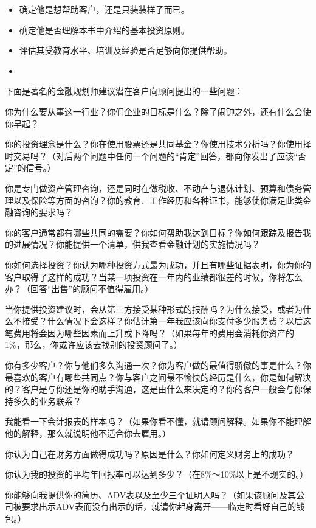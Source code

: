 \documentclass[12pt,oneside]{book}
\begin{document}
\begin{itemize}
\item 确定他是想帮助客户，还是只装装样子而已。
\item 确定他是否理解本书中介绍的基本投资原则。
\item 评估其受教育水平、培训及经验是否足够向你提供帮助。
\item 
\end{itemize}

下面是著名的金融规划师建议潜在客户向顾问提出的一些问题：

你为什么要从事这一行业？你们企业的目标是什么？除了闹钟之外，还有什么会使你早起？

你的投资理念是什么？你在使用股票还是共同基金？你使用技术分析吗？你使用择时交易吗？（对后两个问题中任何一个问题的“肯定”回答，都向你发出了应该“否定”的信号。）

你是专门做资产管理咨询，还是同时在做税收、不动产与退休计划、预算和债务管理以及保险等方面的咨询？你的教育、工作经历和各种证书，能够使你满足此类金融咨询的要求吗？

你的客户通常都有哪些共同的需要？你如何帮助我达到目标？你如何跟踪及报告我的进展情况？你能提供一个清单，供我查看金融计划的实施情况吗？

你如何选择投资？你认为哪种投资方式最为成功，并且有哪些证据表明，你为你的客户取得了这样的成功？当某一项投资在一年内的业绩都很差的时候，你将怎么办？（回答“出售”的顾问不值得雇用。）


当你提供投资建议时，会从第三方接受某种形式的报酬吗？为什么接受，或者为什么不接受？什么情况下会这样？你估计第一年我应该向你支付多少服务费？以后这笔费用将会因为哪些因素而上升或下降吗？（如果每年的费用会消耗你资产的1\%，那么，你或许应该去找别的投资顾问了。）

你有多少客户？你与他们多久沟通一次？你为客户做的最值得骄傲的事是什么？你最喜欢的客户有哪些共同点？你与客户之间最不愉快的经历是什么，你是如何解决的？客户是与你还是你的助手沟通，这是由什么来决定的？你的客户一般会与你保持多久的业务联系？

我能看一下会计报表的样本吗？（如果你看不懂，就请顾问解释。如果你不能理解他的解释，那么就说明他不适合你去雇用。）

你认为自己在财务方面做得成功吗？原因是什么？你如何定义财务上的成功？

你认为我的投资的平均年回报率可以达到多少？（在8\%～10\%以上是不现实的。）

你能够向我提供你的简历、ADV表以及至少三个证明人吗？（如果该顾问及其公司被要求出示ADV表而没有出示的话，就请你起身离开——临走时看好自己的钱包。）
\end{document}

